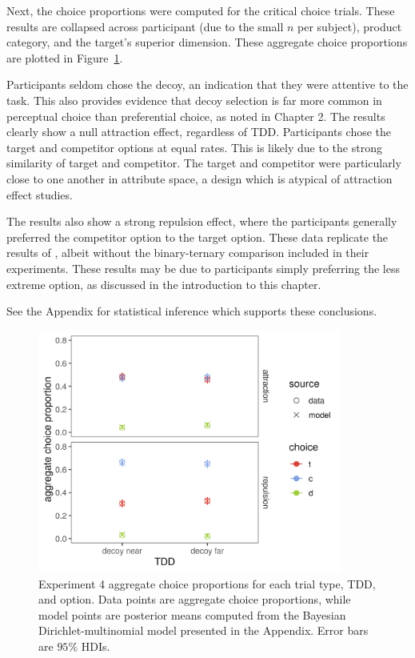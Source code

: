 Next, the choice proportions were computed for the critical choice trials. These results are collapsed across participant (due to the small $n$ per subject), product category, and the target's superior dimension. These aggregate choice proportions are plotted in Figure~\ref{fig:bayes_choice_model_data_plot}.

Participants seldom chose the decoy, an indication that they were attentive to the task. This also provides evidence that decoy selection is far more common in perceptual choice than preferential choice, as noted in Chapter 2. The results clearly show a null attraction effect, regardless of TDD. Participants chose the target and competitor options at equal rates. This is likely due to the strong similarity of target and competitor. The target and competitor were particularly close to one another in attribute space, a design which is atypical of attraction effect studies. 

The results also show a strong repulsion effect, where the participants generally preferred the competitor option to the target option. These data replicate the results of \textcite{banerjeeFactorsThatPromote2024}, albeit without the binary-ternary comparison included in their experiments. These results may be due to participants simply preferring the less extreme option, as discussed in the introduction to this chapter.

See the Appendix for statistical inference which supports these conclusions.

\begin{figure}
    \centering
    \includegraphics[scale=.75,width=100mm]{figures/bayes_choice_model_data_plot.jpeg}
    \caption{Experiment 4 aggregate choice proportions for each trial type, TDD, and option. Data points are aggregate choice proportions, while model points are posterior means computed from the Bayesian Dirichlet-multinomial model presented in the Appendix. Error bars are $95\%$ HDIs.}
    \label{fig:bayes_choice_model_data_plot}
\end{figure}

